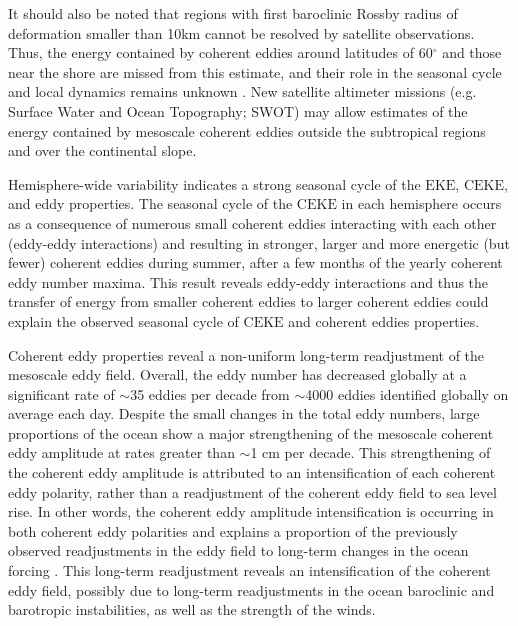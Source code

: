 \documentclass[draft,linenumbers]{agujournal2019}
\newcommand{\EKE}{\textrm{EKE}}
\newcommand{\CEKE}{\textrm{CEKE}}
\begin{document}
	It should also be noted that regions with first baroclinic Rossby radius of deformation smaller than 10km cannot be resolved by satellite observations. 
	Thus, the energy contained by coherent eddies around latitudes of 60$^\circ$ and those near the shore are missed from this estimate, and their role in the seasonal cycle and local dynamics remains unknown . New satellite altimeter missions (e.g. Surface Water and Ocean Topography; SWOT) may allow estimates of the energy contained by mesoscale coherent eddies outside the subtropical regions and over the continental slope.

	Hemisphere-wide variability indicates a strong seasonal cycle of the $\EKE$, $\CEKE$, and eddy properties. 
	The seasonal cycle of the $\CEKE$ in each hemisphere occurs as a consequence of numerous small coherent eddies interacting with each other (eddy-eddy interactions) and resulting in stronger, larger and more energetic (but fewer) coherent eddies during summer, after a few months of the yearly coherent eddy number maxima.
	This result reveals eddy-eddy interactions and thus the transfer of energy from smaller coherent eddies to larger coherent eddies could explain the observed seasonal cycle of $\CEKE$ and coherent eddies properties.
	
	Coherent eddy properties reveal a non-uniform long-term readjustment of the mesoscale eddy field. 
	Overall, the eddy number has decreased globally at a significant rate of $\sim$35 eddies per decade from $\sim$4000 eddies identified globally on average each day. Despite the small changes in the total eddy numbers, large proportions of the ocean show a major strengthening of the mesoscale coherent eddy amplitude at rates greater than $\sim$1 cm per decade.
	This strengthening of the coherent eddy amplitude is attributed to an intensification of each coherent eddy polarity, rather than a readjustment of the coherent eddy field to sea level rise. 
	In other words, the coherent eddy amplitude intensification is occurring in both coherent eddy polarities and explains a proportion of the previously observed readjustments in the eddy field to long-term changes in the ocean forcing \citep{Hu_acceleration_2020,Wunsch_speeding_2020,Martinez_Kinetic_2021}. 
	This long-term readjustment reveals an intensification of the coherent eddy field, possibly due to long-term readjustments in the ocean baroclinic and barotropic instabilities, as well as the strength of the winds.
	
\end{document}
